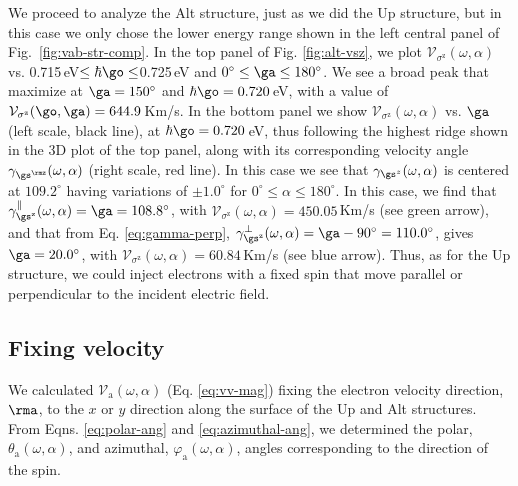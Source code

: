 \documentclass[prb,11pt,tightenlines,twocolumn,aps]{revtex4-1}
\begin{document}
We proceed to analyze the Alt structure, just as we did the Up structure, but
in this case we only chose the lower energy range shown in the left central
panel of Fig.~\ref{fig:vab-str-comp}. 
% 
In the top panel of Fig. \ref{fig:alt-vsz}, we plot
$\mathcal{V}_{\sigma^{\mathrm{z}}} (\omega,\alpha)$ vs.
0.715\,eV$\leq\hbar\go\leq$0.725\,eV and $0^\circ\leq\ga\leq 180^\circ$. We
see a broad peak that maximize at $\ga=150^{\circ}$ and $\hbar\go=
0.720$\,eV, with a value of $\mathcal{V}_{\sigma^{\mathrm{z}}}(\go,\ga) =
644.9$\,Km/s.
% 
In the bottom panel we  show $\mathcal{V}_{\sigma^{\mathrm{z}}}
(\omega,\alpha)$ vs. $\ga$ (left scale, black line), at $\hbar\go= 0.720$\,eV,
{\color{red} thus following the highest ridge shown in the 3D plot of the top
panel, along with its corresponding velocity angle $\gamma_{\gs^\rmz}
(\omega,\alpha)$ (right scale, red line)}. In this case we see that
$\gamma_{\gs^z}(\omega,\alpha)$ is centered at $109.2^{\circ}$ having
variations of $\pm 1.0^{\circ}$ for $0^{\circ} \leq
\alpha \leq 180^{\circ}$.
% 
In this case, we find that $\gamma^\parallel_{\gs^\mathrm{z}} (\omega,\alpha) =
\ga = 108.8^\circ$, with $\mathcal{V}_{\sigma^{\mathrm{z}}} (\omega,\alpha) =
450.05$\,Km/s (see green arrow), and that from Eq. \eqref{eq:gamma-perp},
$\gamma^\perp_{\gs^\mathrm{z}}(\omega,\alpha)=\ga-90^\circ=110.0^\circ$,
gives $\ga=20.0^\circ$, with $\mathcal{V}_{\sigma^{\mathrm{z}}}
(\omega,\alpha) = 60.84$\,Km/s (see blue arrow). Thus, as for the Up structure,
we could inject electrons with a fixed spin that move parallel or perpendicular
to the incident electric field.


\subsection{Fixing velocity} 
\label{sec:res-fixvel}

We calculated $\mathcal{V}_{\mathrm{a}}(\omega,\alpha)$ (Eq. \eqref{eq:vv-mag})
fixing the electron velocity direction, $\rma$, to the $x$ or $y$ direction
along the surface of the Up and Alt structures. From Eqns. \eqref{eq:polar-ang}
and \eqref{eq:azimuthal-ang}, we determined the polar, $\theta_{\mathrm{a}}
(\omega,\alpha)$, and azimuthal, $\varphi_{\mathrm{a}} (\omega,\alpha)$, angles
corresponding to the direction of the spin.
\end{document}
